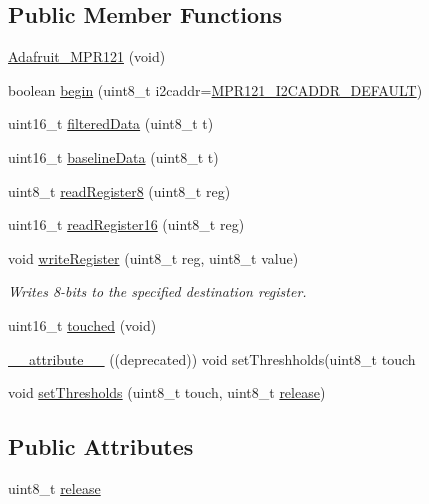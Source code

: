 \subsection*{Public Member Functions}
\begin{DoxyCompactItemize}
\item 
\hyperlink{class_adafruit___m_p_r121_a41a5019501062ae1f94c121c580514b5}{Adafruit\+\_\+\+M\+P\+R121} (void)
\item 
boolean \hyperlink{class_adafruit___m_p_r121_ae269064c42ced60c7450eab53ada5eee}{begin} (uint8\+\_\+t i2caddr=\hyperlink{_adafruit___m_p_r121_8h_aa4a9474e42d9c498f600c9ad8781f714}{M\+P\+R121\+\_\+\+I2\+C\+A\+D\+D\+R\+\_\+\+D\+E\+F\+A\+U\+LT})
\item 
uint16\+\_\+t \hyperlink{class_adafruit___m_p_r121_aa5bda4ff04ee361d857b80d95bddbbdb}{filtered\+Data} (uint8\+\_\+t t)
\item 
uint16\+\_\+t \hyperlink{class_adafruit___m_p_r121_a663d5e60aeb04b06697b2c40a33b40f0}{baseline\+Data} (uint8\+\_\+t t)
\item 
uint8\+\_\+t \hyperlink{class_adafruit___m_p_r121_a344c416d709121094a21d6892e23d28e}{read\+Register8} (uint8\+\_\+t reg)
\item 
uint16\+\_\+t \hyperlink{class_adafruit___m_p_r121_a171bf9f465d96819293657a589450e61}{read\+Register16} (uint8\+\_\+t reg)
\item 
void \hyperlink{class_adafruit___m_p_r121_a5dce866e817cfc15933e56b8dc679a13}{write\+Register} (uint8\+\_\+t reg, uint8\+\_\+t value)
\begin{DoxyCompactList}\small\item\em Writes 8-\/bits to the specified destination register. \end{DoxyCompactList}\item 
uint16\+\_\+t \hyperlink{class_adafruit___m_p_r121_a08b26f327e99b6f205df8907eafcab4c}{touched} (void)
\item 
\hyperlink{class_adafruit___m_p_r121_a56b9f0fb8cead2998dde1de6fcc2eb93}{\+\_\+\+\_\+attribute\+\_\+\+\_\+} ((deprecated)) void set\+Threshholds(uint8\+\_\+t touch
\item 
void \hyperlink{class_adafruit___m_p_r121_a8588eabc494059b6fe5231b8dd2be416}{set\+Thresholds} (uint8\+\_\+t touch, uint8\+\_\+t \hyperlink{class_adafruit___m_p_r121_aff6b909093cf5eca8217990625c860fe}{release})
\end{DoxyCompactItemize}
\subsection*{Public Attributes}
\begin{DoxyCompactItemize}
\item 
uint8\+\_\+t \hyperlink{class_adafruit___m_p_r121_aff6b909093cf5eca8217990625c860fe}{release}
\end{DoxyCompactItemize}


